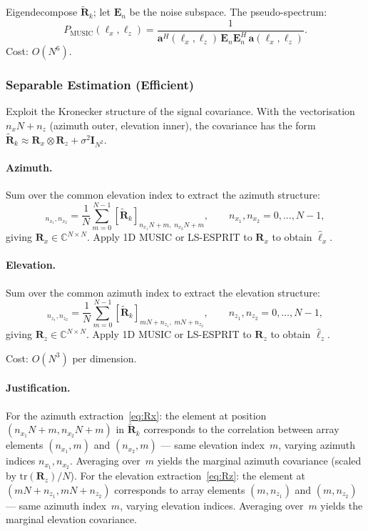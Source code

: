 \documentclass[11pt,a4paper]{article}
\newcommand{\C}{\mathbb{C}}
\begin{document}
Eigendecompose $\tilde{\mathbf{R}}_k$; let $\mathbf{E}_n$ be the
noise subspace.  The pseudo-spectrum:
\begin{equation}
  P_{\mathrm{MUSIC}}(\ell_x,\ell_z)
  =\frac{1}{\mathbf{a}^H(\ell_x,\ell_z)\,
  \mathbf{E}_n\mathbf{E}_n^H\,\mathbf{a}(\ell_x,\ell_z)}.
  \label{eq:music2d}
\end{equation}
Cost: $O(N^6)$.

\subsubsection{Separable Estimation (Efficient)}
\label{sec:sep_doa}

Exploit the Kronecker structure of the signal covariance.  With the
vectorisation $n_x N+n_z$ (azimuth outer, elevation inner), the
covariance has the form
$\tilde{\mathbf{R}}_k\approx\mathbf{R}_x\otimes\mathbf{R}_z
+\sigma^2\mathbf{I}_{N^2}$.

\paragraph{Azimuth.}
Sum over the common elevation index to extract the azimuth
structure:
\begin{equation}
  [\mathbf{R}_x]_{n_{x_1},n_{x_2}}
  =\frac{1}{N}\sum_{m=0}^{N-1}
  [\tilde{\mathbf{R}}_k]_{n_{x_1}N{+}m,\;n_{x_2}N{+}m},
  \qquad n_{x_1},n_{x_2}=0,\ldots,N{-}1,
  \label{eq:Rx}
\end{equation}
giving $\mathbf{R}_x\in\C^{N\times N}$.
Apply 1D MUSIC or LS-ESPRIT to $\mathbf{R}_x$ to obtain
$\hat{\ell}_x$.

\paragraph{Elevation.}
Sum over the common azimuth index to extract the elevation
structure:
\begin{equation}
  [\mathbf{R}_z]_{n_{z_1},n_{z_2}}
  =\frac{1}{N}\sum_{m=0}^{N-1}
  [\tilde{\mathbf{R}}_k]_{mN{+}n_{z_1},\;mN{+}n_{z_2}},
  \qquad n_{z_1},n_{z_2}=0,\ldots,N{-}1,
  \label{eq:Rz}
\end{equation}
giving $\mathbf{R}_z\in\C^{N\times N}$.
Apply 1D MUSIC or LS-ESPRIT to $\mathbf{R}_z$ to obtain
$\hat{\ell}_z$.

Cost: $O(N^3)$ per dimension.

\paragraph{Justification.}
For the azimuth extraction~\eqref{eq:Rx}: the element at position
$(n_{x_1}N{+}m, n_{x_2}N{+}m)$ in $\tilde{\mathbf{R}}_k$
corresponds to the correlation between array elements
$(n_{x_1},m)$ and $(n_{x_2},m)$ — same elevation index~$m$,
varying azimuth indices $n_{x_1},n_{x_2}$.  Averaging over~$m$
yields the marginal azimuth covariance (scaled by
$\mathrm{tr}(\mathbf{R}_z)/N$).
For the elevation extraction~\eqref{eq:Rz}: the element at
$(mN{+}n_{z_1}, mN{+}n_{z_2})$ corresponds to array elements
$(m,n_{z_1})$ and $(m,n_{z_2})$ — same azimuth index~$m$,
varying elevation indices.  Averaging over~$m$ yields the marginal
elevation covariance.
\end{document}
